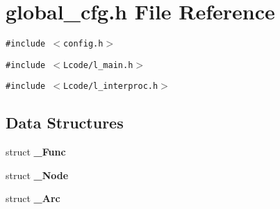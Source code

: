 \section{global\_\-cfg.h File Reference}
\label{global__cfg_8h}
{\tt \#include $<$config.h$>$}\par
{\tt \#include $<$Lcode/l\_\-main.h$>$}\par
{\tt \#include $<$Lcode/l\_\-interproc.h$>$}\par
\subsection*{Data Structures}
\begin{CompactItemize}
\item 
struct \bf{\_\-Func}
\item 
struct \bf{\_\-Node}
\item 
struct \bf{\_\-Arc}
\end{CompactItemize}

